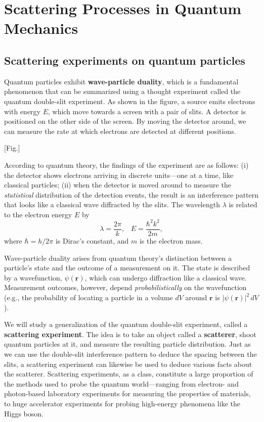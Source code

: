 \documentclass[pra,11pt]{revtex4}
\begin{document}
\section{Scattering Processes in Quantum Mechanics}

\subsection{Scattering experiments on quantum particles}

Quantum particles exhibit \textbf{wave-particle duality}, which is a
fundamental phenomenon that can be summarized using a thought
experiment called the quantum double-slit experiment.  As shown in the
figure, a source emits electrons with energy $E$, which move towards a
screen with a pair of slits.  A detector is positioned on the other
side of the screen.  By moving the detector around, we can measure the
rate at which electrons are detected at different positions.

[Fig.]

According to quantum theory, the findings of the experiment are as
follows: (i) the detector shows electrons arriving in discrete
units---one at a time, like classical particles; (ii) when the
detector is moved around to measure the \textit{statistical}
distribution of the detection events, the result is an interference
pattern that looks like a classical wave diffracted by the slits.  The
wavelength $\lambda$ is related to the electron energy $E$ by
$$\lambda = \frac{2\pi}{k}, \;\;\; E = \frac{\hbar^2k^2}{2m},$$
where $\hbar = h/2\pi$ is Dirac's constant, and $m$ is the electron
mass.

Wave-particle duality arises from quantum theory's distinction between
a particle's state and the outcome of a measurement on it.  The state
is described by a wavefunction, $\psi(\mathbf{r})$, which can undergo
diffraction like a classical wave.  Measurement outcomes, however,
depend \textit{probabilistically} on the wavefunction (e.g., the
probability of locating a particle in a volume $dV$ around
$\mathbf{r}$ is $|\psi(\mathbf{r})|^2 \,dV$).

We will study a generalization of the quantum double-slit experiment,
called a \textbf{scattering experiment}.  The idea is to take an
object called a \textbf{scatterer}, shoot quantum particles at it, and
measure the resulting particle distribution.  Just as we can use the
double-slit interference pattern to deduce the spacing between the
slits, a scattering experiment can likewise be used to deduce various
facts about the scatterer.  Scattering experiments, as a class,
constitute a large proportion of the methods used to probe the quantum
world---ranging from electron- and photon-based laboratory experiments
for measuring the properties of materials, to huge accelerator
experiments for probing high-energy phenomena like the Higgs boson.
\end{document}
